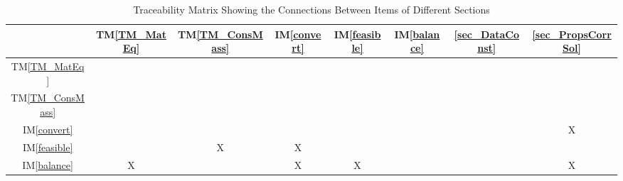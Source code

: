 \documentclass[12pt]{article}
\newcommand{\tmref}[1]{TM\ref{#1}}
\newcommand{\iref}[1]{IM\ref{#1}}
\begin{document}
\begin{table}[h!]
  \centering
  \begin{tabular}{|c|c|c|c|c|c|c|c|}
    \hline
                        & \tmref{TM_MatEq} & \tmref{TM_ConsMass} & \iref{convert} & \iref{feasible} & \iref{balance} & \ref{sec_DataConst} & \ref{sec_PropsCorrSol} \\
    \hline
    \tmref{TM_MatEq}    &                  &                     &                &                 &                &                     &                        \\ \hline
    \tmref{TM_ConsMass} &                  &                     &                &                 &                &                     &                        \\ \hline
    \iref{convert}      &                  &                     &                &                 &                &                     & X                      \\ \hline
    \iref{feasible}     &                  & X                   & X              &                 &                &                     &                        \\ \hline
    \iref{balance}      & X                &                     & X              & X               &                &                     & X                      \\ \hline
  \end{tabular}
  \caption{Traceability Matrix Showing the Connections Between Items of Different Sections}
  \label{Table:srs_trace}
\end{table}
\end{document}
